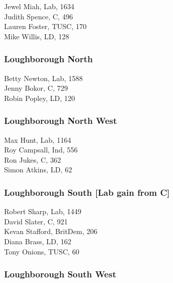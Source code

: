 \documentclass[a4paper,openany,10pt]{book}
\begin{document}


Jewel Miah, Lab, 1634\\
Judith Spence, C, 496\\
Lauren Foster, TUSC, 170\\
Mike Willis, LD, 128\\


\subsubsection*{Loughborough North}



Betty Newton, Lab, 1588\\
Jenny Bokor, C, 729\\
Robin Popley, LD, 120\\


\subsubsection*{Loughborough North West}



Max Hunt, Lab, 1164\\
Roy Campsall, Ind, 556\\
Ron Jukes, C, 362\\
Simon Atkins, LD, 62\\


\subsubsection*{Loughborough South \hspace*{\fill}\nolinebreak[1]%
\enspace\hspace*{\fill}
[Lab gain from C]}



Robert Sharp, Lab, 1449\\
David Slater, C, 921\\
Kevan Stafford, BritDem, 206\\
Diana Brass, LD, 162\\
Tony Onions, TUSC, 60\\


\subsubsection*{Loughborough South West}
\end{document}
